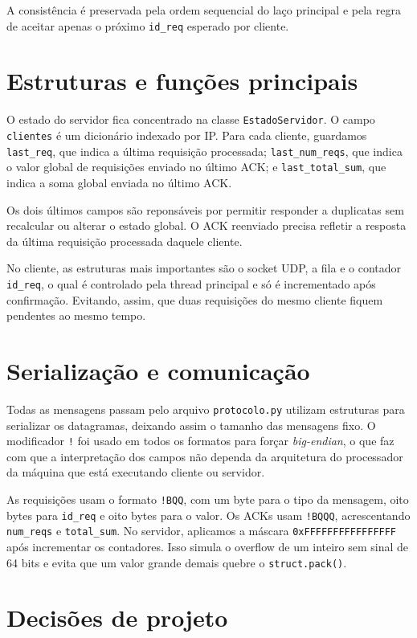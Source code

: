 \documentclass[12pt,a4paper]{article}
\begin{document}
A consistência é preservada pela ordem sequencial do laço principal e pela regra de aceitar
apenas o próximo \texttt{id\_req} esperado por cliente.

\section*{Estruturas e funções principais}

O estado do servidor fica concentrado na classe \texttt{EstadoServidor}. O campo
\texttt{clientes} é um dicionário indexado por IP. Para cada cliente, guardamos
\texttt{last\_req}, que indica a última requisição processada;
\texttt{last\_num\_reqs}, que indica o valor global de requisições enviado no
último ACK; e \texttt{last\_total\_sum}, que indica a soma global enviada no
último ACK.

Os dois últimos campos são reponsáveis por
permitir responder a duplicatas sem recalcular ou alterar o estado global. O ACK
reenviado precisa refletir a resposta da última requisição processada daquele cliente.

No cliente, as estruturas mais importantes são o socket UDP, a fila e o contador \texttt{id\_req}, o qual é controlado pela thread principal e só é incrementado após confirmação. Evitando, assim, que duas requisições
do mesmo cliente fiquem pendentes ao mesmo tempo.

\section*{Serialização e comunicação}

Todas as mensagens passam pelo arquivo \texttt{protocolo.py} utilizam estruturas para
serializar os datagramas, deixando assim o tamanho das
mensagens fixo.
O modificador \texttt{!} foi usado em todos os formatos para forçar
\textit{big-endian}, o que faz com que a interpretação dos campos não dependa da arquitetura
do processador da máquina que está executando cliente ou servidor.

As requisições usam o formato \texttt{!BQQ}, com um byte para o tipo da mensagem,
oito bytes para \texttt{id\_req} e oito bytes para o valor. Os ACKs usam
\texttt{!BQQQ}, acrescentando \texttt{num\_reqs} e \texttt{total\_sum}. No
servidor, aplicamos a máscara \texttt{0xFFFFFFFFFFFFFFFF} após incrementar os
contadores. Isso simula o overflow de um inteiro sem sinal de 64 bits e evita que
um valor grande demais quebre o \texttt{struct.pack()}.

\section*{Decisões de projeto}
\end{document}
